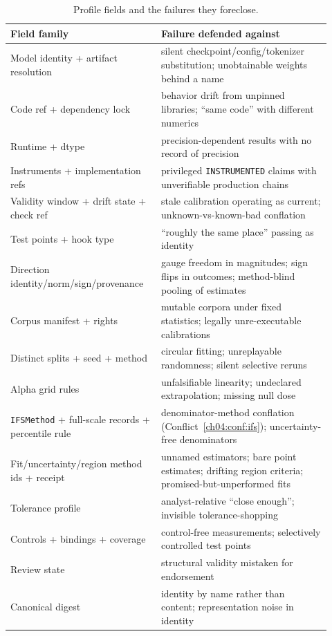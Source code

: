 \begin{table}[htbp]
\centering\small
\begin{tabular}{@{}p{0.42\linewidth}p{0.5\linewidth}@{}}
\toprule
Field family & Failure defended against \\
\midrule
Model identity + artifact resolution & silent checkpoint/config/tokenizer
substitution; unobtainable weights behind a name \\
Code ref + dependency lock & behavior drift from unpinned libraries;
``same code'' with different numerics \\
Runtime + dtype & precision-dependent results with no record of precision \\
Instruments + implementation refs & privileged \texttt{INSTRUMENTED} claims
with unverifiable production chains \\
Validity window + drift state + check ref & stale calibration operating as
current; unknown-vs-known-bad conflation \\
Test points + hook type & ``roughly the same place'' passing as identity \\
Direction identity/norm/sign/provenance & gauge freedom in magnitudes; sign
flips in outcomes; method-blind pooling of estimates \\
Corpus manifest + rights & mutable corpora under fixed statistics;
legally unre-executable calibrations \\
Distinct splits + seed + method & circular fitting; unreplayable randomness;
silent selective reruns \\
Alpha grid rules & unfalsifiable linearity; undeclared extrapolation;
missing null dose \\
\texttt{IFSMethod} + full-scale records + percentile rule &
denominator-method conflation (Conflict~\ref{ch04:conf:ifs});
uncertainty-free denominators \\
Fit/uncertainty/region method ids + receipt & unnamed estimators; bare point
estimates; drifting region criteria; promised-but-unperformed fits \\
Tolerance profile & analyst-relative ``close enough''; invisible
tolerance-shopping \\
Controls + bindings + coverage & control-free measurements; selectively
controlled test points \\
Review state & structural validity mistaken for endorsement \\
Canonical digest & identity by name rather than content; representation
noise in identity \\
\bottomrule
\end{tabular}
\caption{Profile fields and the failures they foreclose.}
\label{ch05:tab:threats}
\end{table}

